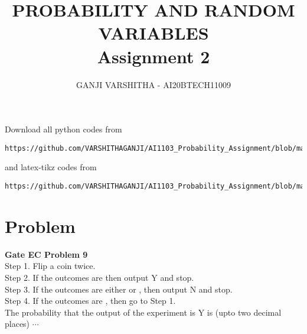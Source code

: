 \documentclass[journal,12pt,twocolumn]{IEEEtran}
\begin{document}
     \def\centbox#1{\makebox[0in]{#1}}
     \def\topbox#1{\raisebox{-\baselineskip}[0in][0in]{#1}}
     \def\midbox#1{\raisebox{-0.5\baselineskip}[0in][0in]{#1}}
\vspace{3cm}
\title{\textbf{PROBABILITY AND RANDOM VARIABLES \\ Assignment 2}}
\author{GANJI VARSHITHA - AI20BTECH11009}
\maketitle
\newpage
\bigskip
\renewcommand{\thefigure}{\theenumi}
\renewcommand{\thetable}{\theenumi}
Download all python codes from 
\begin{lstlisting}
https://github.com/VARSHITHAGANJI/AI1103_Probability_Assignment/blob/main/Assignment2.py
\end{lstlisting}
%
and latex-tikz codes from 
%
\begin{lstlisting}
https://github.com/VARSHITHAGANJI/AI1103_Probability_Assignment/blob/main/Assignment2.tex
\end{lstlisting}
\section*{Problem}
\textbf{Gate EC Problem 9 }
\\
Step 1. Flip a coin twice.\\
Step 2. If the outcomes are 
then output Y and stop.\\
Step 3. If the outcomes are either  or , then output N
and stop.\\
Step 4. If the outcomes are ,
then go to Step 1.\\
The probability that the output of the experiment is Y is (upto two decimal places) $\cdots$
\end{document}

